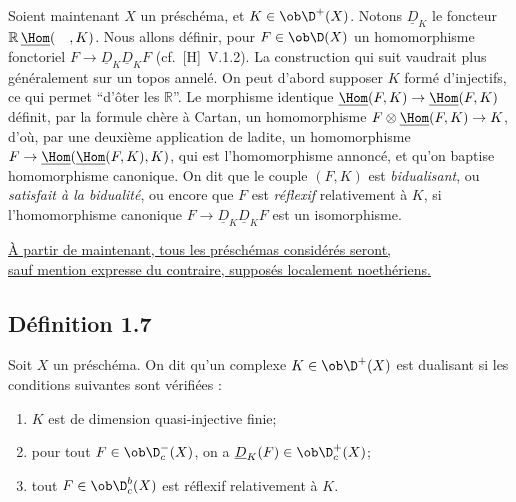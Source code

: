 Soient maintenant $X$ un préschéma, et $K \in \ob \D^{+}(X)$. Notons $\underline{D}_K$ le foncteur $\mathbb{R}\,\underline{\Hom}(\quad, K)$. Nous allons définir, pour $F \in \ob \D(X)$ un homomorphisme fonctoriel $F \to \underline{D}_K \underline{D}_K F$ (cf.~[H]~V.1.2). La construction qui suit vaudrait plus généralement sur un topos annelé. On peut d'abord supposer $K$
formé d'injectifs, ce qui permet ``d'ôter les $\mathbb{R}$''. Le morphisme identique $\underline{\Hom}(F,K) \to \underline{\Hom}(F,K)$ définit, par la formule chère à Cartan, un homomorphisme $F \otimes \underline{\Hom}(F,K) \to K$, d'où, par une deuxième application de ladite, un homomorphisme $F \to \underline{\Hom}(\underline{\Hom}(F,K), K)$, qui est l'homomorphisme annoncé, et qu'on baptise homomorphisme canonique. On dit que le couple $(F,K)$ est \emph{bidualisant}, ou \emph{satisfait à la bidualité}, ou encore que $F$ est \emph{réflexif} relativement à $K$, si l'homomorphisme canonique $F \to \underline{D}_K \underline{D}_K F$ est un isomorphisme.

\noindent\underline{À partir de maintenant, tous les préschémas considérés seront,}\\[-0.1em]\underline{sauf mention expresse du contraire, supposés localement noethériens.}

\subsection*{Définition 1.7}
Soit $X$ un préschéma. On dit qu'un complexe $K \in \ob \D^{+}(X)$ est dualisant si les conditions suivantes sont vérifiées :
\begin{enumerate}[label=(\roman*)]
\item $K$ est de dimension quasi-injective finie;
\item pour tout $F \in \ob \D_c^{-}(X)$, on a $\underline{D}_K(F) \in \ob \D_c^{+}(X)$;
\item tout $F \in \ob \D_c^{b}(X)$ est réflexif relativement à $K$.
\end{enumerate}

